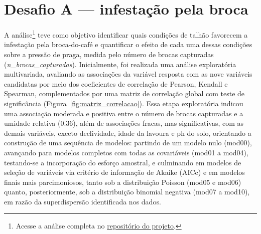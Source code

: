 
\section{Desafio A --- infestação pela broca}
\label{sec:desafioA}

A análise\footnote{Acesse a análise completa no \href{https://github.com/leticiazorzirama/generalized_linear_models_coffee_farming/blob/main/challenge_a/challenge_a.R}{repositório do projeto}.}
teve como objetivo identificar quais condições de talhão favorecem a
infestação pela broca-do-café e quantificar o efeito de cada uma dessas condições
sobre a pressão de praga, medida pelo número de brocas capturadas
(\textit{n\_brocas\_capturadas}). Inicialmente, foi realizada uma análise
exploratória multivariada, avaliando as associações da variável resposta com as
nove variáveis candidatas por meio dos coeficientes de correlação de Pearson,
Kendall e Spearman, complementados por uma matriz de correlação global com teste
de significância (Figura~\ref{fig:matriz_correlacao}). 
Essa etapa exploratória indicou uma associação moderada e positiva entre o número de 
brocas capturadas e a umidade relativa (0.36), além de associações fracas, mas significativas, 
com as demais variáveis, exceto declividade, idade da lavoura e ph do solo, orientando a 
construção de uma sequência de modelos: partindo de um modelo nulo (mod00), avançando 
para modelos completos com todas as covariáveis (mod01 a mod04), testando-se a incorporação
do esforço amostral, e culminando em modelos de seleção de variáveis via critério de 
informação de Akaike (AICc) e em modelos finais mais parcimoniosos, tanto sob a distribuição
Poisson (mod05 e mod06) quanto, posteriormente, sob a distribuição binomial negativa 
(mod07 a mod10), em razão da superdispersão identificada nos dados.

